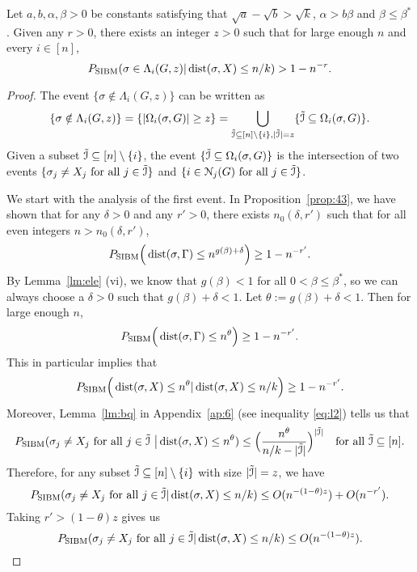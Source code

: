 \documentclass{article}
\begin{document}
\begin{lemma} \label{lm:us}
	Let $a,b,\alpha,\beta> 0$ be constants satisfying that $\sqrt{a}-\sqrt{b} > \sqrt{k}$, $\alpha>b\beta$ and $\beta\le \beta^\ast$.
	Given any $r>0$, there exists an integer $z>0$ such that for large enough $n$ and every $i\in[n]$, 
	\begin{equation} \label{eq:zr}
	P_{\operatorname{SIBM}} (\sigma\in \Lambda_i(G, z)
	| \operatorname{dist}(\sigma, X) \le n/k)
	> 1 - n^{-r} .
	\end{equation}
\end{lemma}
\begin{proof}
	The event $\{\sigma\notin \Lambda_i(G, z) \}$ can be written as
	\begin{equation} \label{eq:lei}
	\{\sigma\notin \Lambda_i(G, z) \}
	=\{|\Omega_i(\sigma,G)| \ge z \}
	=\bigcup_{\tilde{\mathcal{I}}\subseteq[n]\setminus\{i\}, |\tilde{\mathcal{I}}| = z} \{\tilde{\mathcal{I}} \subseteq \Omega_i(\sigma,G)\} .
	\end{equation}
	Given a subset $\tilde{\mathcal{I}}\subseteq[n]\setminus\{i\}$,
	the event $\{\tilde{\mathcal{I}} \subseteq \Omega_i(\sigma,G) \}$ is the intersection of two events $\{\sigma_j \neq X_j \text{~for all~} j\in \tilde{\mathcal{I}}\}$ and $\{i\in\mathcal{N}_j(G) \text{~for all~} j\in \tilde{\mathcal{I}}\}$.
	
	We start with the analysis of the first event.
	In Proposition~\ref{prop:43}, we have shown that
	for any $\delta>0$ and any $r'>0$, there exists $n_0(\delta, r')$ such that for all even integers $n>n_0(\delta, r')$,
	$$ 
	P_{\operatorname{SIBM}} \Big(\operatorname{dist}(\sigma, \Gamma) \le n^{g(\beta)+\delta}
	\Big) \ge 1- n^{-r'} .
	$$
	By Lemma~\ref{lm:ele} (vi), we know that $g(\beta)<1$ for all $0<\beta\le\beta^\ast$, so we can always choose a $\delta>0$ such that $g(\beta)+\delta<1$.
	Let $\theta:=g(\beta)+\delta<1$. Then for large enough $n$,
	$$
	P_{\operatorname{SIBM}} \Big(\operatorname{dist}(\sigma, \Gamma) \le n^{\theta} \Big) \ge 1- n^{-r'} .
	$$
	This in particular implies that
	$$
	P_{\operatorname{SIBM}} \Big(\operatorname{dist}(\sigma, X) \le n^{\theta} | \operatorname{dist}(\sigma, X) \le n/k
	\Big) \ge 1- n^{-r'} .
	$$
	Moreover, Lemma~\ref{lm:bq} in Appendix~\ref{ap:6} (see inequality \eqref{eq:l2}) tells us that
	$$
	P_{\operatorname{SIBM}}(\sigma_j \neq X_j \text{~for all~}  j\in\tilde{\mathcal{I}}
	~\big| \operatorname{dist}(\sigma,X) \le n^\theta) \le \Big(\frac{n^\theta}{n/k-|\tilde{\mathcal{I}}|}
	\Big)^{|\tilde{\mathcal{I}}|}
	\quad \text{for all~} \tilde{\mathcal{I}}\subseteq [n] .
	$$
	Therefore, for any subset $\tilde{\mathcal{I}}\subseteq[n]\setminus\{i\}$ with size $|\tilde{\mathcal{I}}|=z$, we have
	$$
	P_{\operatorname{SIBM}}(\sigma_j \neq X_j \text{~for all~} j\in \tilde{\mathcal{I}}
	| \operatorname{dist}(\sigma, X) \le n/k )
	\le O(n^{-(1-\theta) z}) + O(n^{-r'}) . 
	$$
	Taking $r'>(1-\theta) z$ gives us
	\begin{equation} \label{eq:gr}
	P_{\operatorname{SIBM}}(\sigma_j \neq X_j \text{~for all~} j\in \tilde{\mathcal{I}}
	| \operatorname{dist}(\sigma, X) \le n/k )
	\le O(n^{-(1-\theta) z}) . 
	\end{equation}
	

\end{proof}
\end{document}
